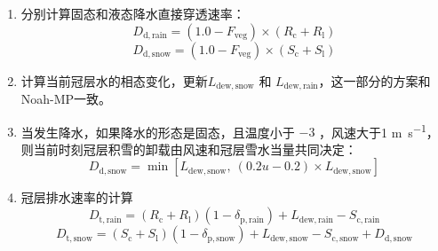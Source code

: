 \begin{enumerate}
  \item 分别计算固态和液态降水直接穿透速率：
    \begin{equation}
      D_{\mathrm{d,rain}}=\left(1.0-F_{\mathrm{veg}}\right) \times (R_{\mathrm{c}}+R_{\mathrm{l}})
    \end{equation}
    \begin{equation}
      D_{\mathrm{d,snow}}=\left(1.0-F_{\mathrm{veg}}\right) \times (S_{\mathrm{c}}+S_{\mathrm{l}})
    \end{equation}

  \item 计算当前冠层水的相态变化，更新$L_{\mathrm{dew,snow}}$ 和 $L_{\mathrm{dew,rain}}$，这一部分的方案和Noah-MP一致。

  \item 当发生降水，如果降水的形态是固态，且温度小于 $-3$ \textcelsius ，风速大于1 \unit{m.s^{-1}}，则当前时刻冠层积雪的卸载由风速和冠层雪水当量共同决定：
    \begin{equation}
      D_{\mathrm{d,snow}} = \min\left[L_{\mathrm{dew,snow}},\ (0.2u-0.2) \times L_{\mathrm{dew,snow}}\right]
    \end{equation}

  \item 冠层排水速率的计算
    \begin{equation}
      D_{\mathrm {t,rain}}=\left(R_{\mathrm{c}}+R_{\mathrm{l}}\right)\left(1-\delta_{\mathrm{p,rain}}\right)+L_{\mathrm{dew,rain}}-S_{\mathrm{c,rain}}
    \end{equation}
    \begin{equation}
      D_{\mathrm {t,snow}}=\left(S_{\mathrm{c}}+S_{\mathrm{l}}\right)\left(1-\delta_{\mathrm{p,snow}}\right)+L_{\mathrm{dew,snow}}-S_{\mathrm{c,snow}}+D_{\mathrm{d,snow}}
    \end{equation}


\end{enumerate}
